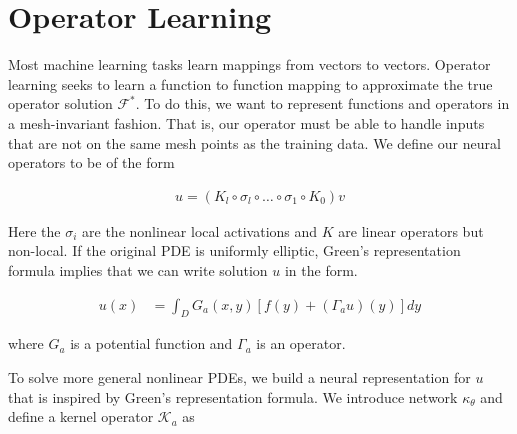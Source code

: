 \documentclass[book.tex]{subfiles}
\begin{document}
\section{Operator Learning}

Most machine learning tasks learn mappings from vectors to vectors. Operator learning seeks to learn a function to function mapping to approximate the true operator solution $\mathcal{F}^*$. To do this, we want to represent functions and operators in a mesh-invariant fashion. That is, our operator must be able to handle inputs that are not on the same mesh points as the training data. We define our neural operators to be of the form

\begin{align}
    u = (K_l \circ \sigma_l \circ \dotsc \circ \sigma_1 \circ K_0)v
\end{align}

Here the $\sigma_i$ are the nonlinear local activations and $K$ are linear operators but non-local. If the original PDE is uniformly elliptic, Green's representation formula implies that we can write solution $u$ in the form.

\begin{align}
    u(x) &= \int_D G_a(x,y)[f(y) + (\Gamma_a u)(y)] dy
\end{align}

\noindent where $G_a$ is a potential function and $\Gamma_a$ is an operator.

To solve more general nonlinear PDEs, we build a neural representation for $u$ that is inspired by Green's representation formula. We introduce network $\kappa_\theta$ and define a kernel operator $\mathcal{K}_a$ as
\end{document}
